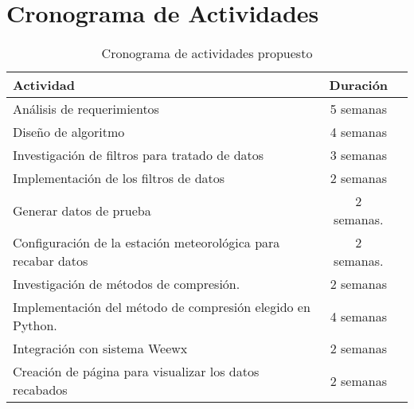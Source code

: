 \clearpage %

\section{Cronograma de Actividades}


\begin{table}[!th]
\begin{tabular}{|l|c|r|}
\hline
Actividad & Duración \\ \hline
Análisis de requerimientos & 5 semanas \\
Diseño de algoritmo & 4 semanas \\
Investigación de filtros para tratado de datos & 3 semanas \\
Implementación de los filtros de datos & 2 semanas\\
Generar datos de prueba & 2 semanas. \\
Configuración de la estación meteorológica para recabar datos & 2 semanas. \\
Investigación de métodos de compresión. & 2 semanas  \\
Implementación del método de compresión elegido en Python. & 4 semanas \\
Integración con sistema Weewx & 2 semanas \\
Creación de página para visualizar los datos recabados & 2 semanas \\
\hline
\end{tabular}
\caption{Cronograma de actividades propuesto}
\label{ex:cronograma}
\end{table}

